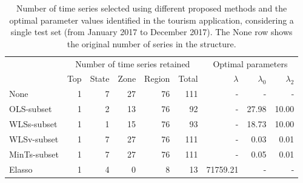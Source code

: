 \documentclass[
  11pt]{article}
\begin{document}
\hypertarget{tbl-tourism-info}{}
\begin{table}
\caption{\label{tbl-tourism-info}Number of time series selected using different proposed methods and the
optimal parameter values identified in the tourism application,
considering a single test set (from January 2017 to December 2017). The
None row shows the original number of series in the structure. }\tabularnewline

\centering\begingroup\fontsize{10}{12}\selectfont

\begin{tabular}{lrrrrrrrr}
\toprule
\multicolumn{1}{c}{} & \multicolumn{5}{c}{Number of time series retained} & \multicolumn{3}{c}{Optimal parameters} \\
\cmidrule(l{3pt}r{3pt}){2-6} \cmidrule(l{3pt}r{3pt}){7-9}
  & Top & State & Zone & Region & Total & $\lambda$ & $\lambda_0$ & $\lambda_2$\\
\midrule
None & 1 & 7 & 27 & 76 & 111 & - & - & -\\
OLS-subset & 1 & 2 & 13 & 76 & 92 & - & 27.98 & 10.00\\
WLSs-subset & 1 & 1 & 15 & 76 & 93 & - & 18.73 & 10.00\\
WLSv-subset & 1 & 7 & 27 & 76 & 111 & - & 0.03 & 0.01\\
MinTs-subset & 1 & 7 & 27 & 76 & 111 & - & 0.05 & 0.01\\
Elasso & 1 & 4 & 0 & 8 & 13 & 71759.21 & - & -\\
\bottomrule
\end{tabular}
\endgroup{}
\end{table}
\end{document}
